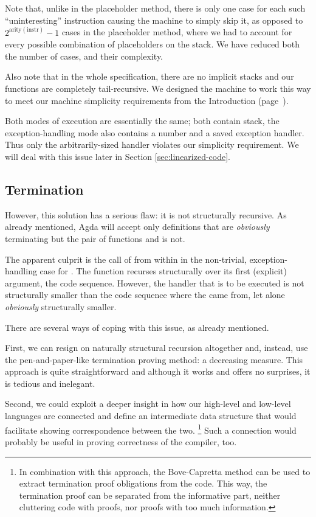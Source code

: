 Note that, unlike in the placeholder method, there is only one case for each
such ``uninteresting'' instruction causing the machine to simply skip it, as
opposed to $2^{\mathrm{arity(instr)}} - 1$ cases in the placeholder method,
where we had to account for every possible combination of placeholders on the
stack. We have reduced both the number of cases, and their complexity.

Also note that in the whole specification, there are no implicit stacks and our
functions are completely tail-recursive. We designed the machine to work this
way to meet our machine simplicity requirements from the Introduction
(page~\pageref{objectives}).

Both modes of execution are essentially the same; both contain stack, the
exception-handling mode also contains a number and a saved exception handler.
Thus only the arbitrarily-sized handler violates our simplicity requirement.
We will deal with this issue later in Section \ref{sec:linearized-code}.

\subsection{Termination}

However, this solution has a serious flaw: it is not structurally recursive.
As already mentioned, Agda will accept only definitions that are \emph{obviously}
terminating but the pair of functions  and 
is not.

The apparent culprit is the call of  from within
 in the non-trivial, exception-handling case for
. The function  recurses structurally over its
first (explicit) argument, the code sequence. However, the handler that is to
be executed is not structurally smaller than the code sequence where the
 came from, let alone \emph{obviously} structurally smaller.

There are several ways of coping with this issue, as already mentioned.

First, we can resign on naturally structural recursion altogether and, instead,
use the pen-and-paper-like termination proving method: a decreasing measure.
This approach is quite straightforward and although it works and offers no
surprises, it is tedious and inelegant.

Second, we could exploit a deeper insight in how our high-level and low-level
languages are connected and define an intermediate data structure that would
facilitate showing correspondence between the two.%
\footnote{In combination with this approach, the Bove-Capretta method
\cite{bove-capretta} can be used to
extract termination proof obligations from the code. This way, the
termination proof can be separated from the informative part, neither cluttering code with
proofs, nor proofs with too much information.} Such a connection would probably
be useful in proving correctness of the compiler, too.

